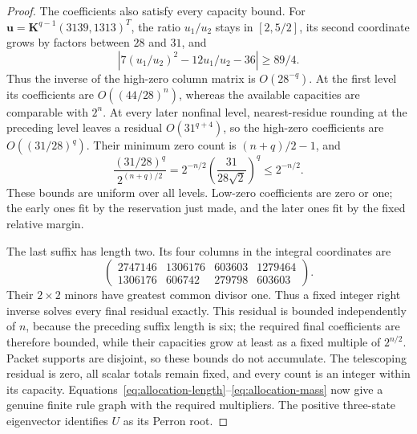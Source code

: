 \begin{proof}
The coefficients also satisfy every capacity bound. For $\mathbf u=\mathbf K^{q-1}(3139,1313)^T$, the ratio $u_1/u_2$ stays in $[2,5/2]$, its second coordinate grows by factors between $28$ and $31$, and
\[
 |7(u_1/u_2)^2-12u_1/u_2-36|\ge89/4.
\]
Thus the inverse of the high-zero column matrix is $O(28^{-q})$. At the first level its coefficients are $O((44/28)^n)$, whereas the available capacities are comparable with $2^n$. At every later nonfinal level, nearest-residue rounding at the preceding level leaves a residual $O(31^{q+4})$, so the high-zero coefficients are $O((31/28)^q)$. Their minimum zero count is $(n+q)/2-1$, and
\[
 \frac{(31/28)^q}{2^{(n+q)/2}}
 =2^{-n/2}\left(\frac{31}{28\sqrt2}\right)^q\le2^{-n/2}.
\]
These bounds are uniform over all levels. Low-zero coefficients are zero or one; the early ones fit by the reservation just made, and the later ones fit by the fixed relative margin.

The last suffix has length two. Its four columns in the integral coordinates are
\[
 \begin{pmatrix}
 2747146&1306176&603603&1279464\\
 1306176&606742&279798&603603
 \end{pmatrix}.
\]
Their $2\times2$ minors have greatest common divisor one. Thus a fixed integer right inverse solves every final residual exactly. This residual is bounded independently of $n$, because the preceding suffix length is six; the required final coefficients are therefore bounded, while their capacities grow at least as a fixed multiple of $2^{n/2}$. Packet supports are disjoint, so these bounds do not accumulate. The telescoping residual is zero, all scalar totals remain fixed, and every count is an integer within its capacity. Equations~\eqref{eq:allocation-length}--\eqref{eq:allocation-mass} now give a genuine finite rule graph with the required multipliers. The positive three-state eigenvector identifies $U$ as its Perron root.
\end{proof}

